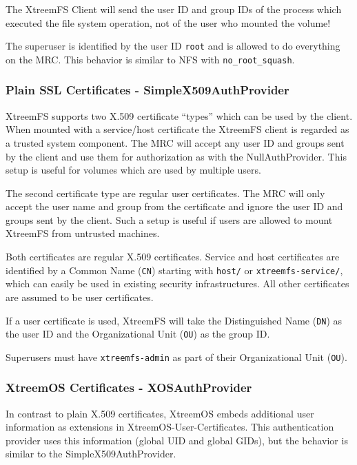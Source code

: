 \documentclass[a4paper,10pt]{book}
\begin{document}
The XtreemFS Client will send the user ID and group IDs of the process which executed the file system operation, not of the user who mounted the volume!

The superuser is identified by the user ID \texttt{root} and is allowed to do everything on the MRC. This behavior is similar to NFS with \texttt{no\_root\_squash}.

\subsubsection{Plain SSL Certificates - SimpleX509AuthProvider}

XtreemFS supports two X.509 certificate ``types'' which can be used by the client. When mounted with a service/host certificate the XtreemFS client is regarded as a trusted system component. The MRC will accept any user ID and groups sent by the client and use them for authorization as with the NullAuthProvider. This setup is useful for volumes which are used by multiple users.

The second certificate type are regular user certificates. The MRC will only accept the user name and group from the certificate and ignore the user ID and groups sent by the client. Such a setup is useful if users are allowed to mount XtreemFS from untrusted machines.

Both certificates are regular X.509 certificates. Service and host certificates are identified by a Common Name (\texttt{CN}) starting with \texttt{host/} or \texttt{xtreemfs-service/}, which can easily be used in existing security infrastructures. All other certificates are assumed to be user certificates.

If a user certificate is used, XtreemFS will take the Distinguished Name (\texttt{DN}) as the user ID and the Organizational Unit (\texttt{OU}) as the group ID.

Superusers must have \texttt{xtreemfs-admin} as part of their Organizational Unit (\texttt{OU}).

\subsubsection{XtreemOS Certificates - XOSAuthProvider}

In contrast to plain X.509 certificates, XtreemOS embeds additional user information as extensions in XtreemOS-User-Certificates. This authentication provider uses this information (global UID and global GIDs), but the behavior is similar to the SimpleX509AuthProvider.
\end{document}
